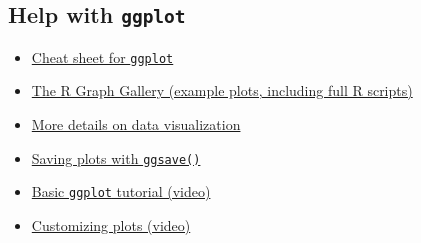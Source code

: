 \documentclass[
]{article}
\providecommand{\tightlist}{%
  \setlength{\itemsep}{0pt}\setlength{\parskip}{0pt}}
\begin{document}
\hypertarget{help-with-ggplot}{%
\subsection{\texorpdfstring{Help with
\texttt{ggplot}}{Help with ggplot}}\label{help-with-ggplot}}

\begin{itemize}
\tightlist
\item
  \href{https://github.com/rstudio/cheatsheets/blob/main/data-visualization-2.1.pdf}{Cheat
  sheet for \texttt{ggplot}}
\item
  \href{https://www.r-graph-gallery.com/}{The R Graph Gallery (example
  plots, including full R scripts)}
\item
  \href{https://mdsr-book.github.io/mdsr2e/ch-vizII.html\#a-grammar-for-data-graphics}{More
  details on data visualization}
\item
  \href{https://www.tutorialgateway.org/save-r-ggplot-using-ggsave/}{Saving
  plots with \texttt{ggsave()}}
\item
  \href{https://www.youtube.com/watch?v=hr2X7rmkprM}{Basic
  \texttt{ggplot} tutorial (video)}
\item
  \href{https://www.youtube.com/watch?v=1GmQ5BdAhG4}{Customizing plots
  (video)}
\end{itemize}
\end{document}
